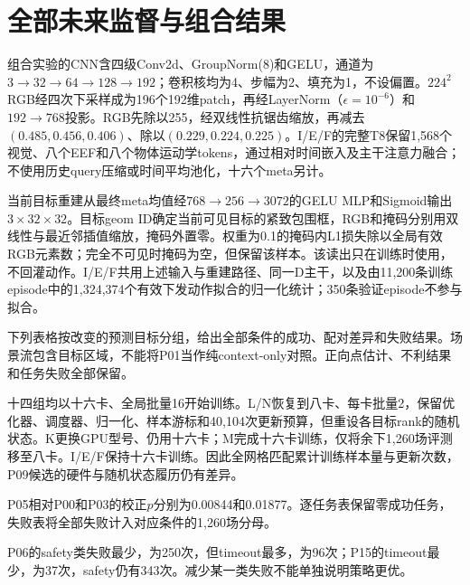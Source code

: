 \FloatBarrier
\section{全部未来监督与组合结果}
\label{app:q2}
\FloatBarrier
\begingroup
\renewenvironment{table}[1][]{\begin{readingtable}}{\end{readingtable}}
\renewenvironment{table*}[1][]{\begin{readingtable}}{\end{readingtable}}
组合实验的CNN含四级Conv2d、GroupNorm(8)和GELU，通道为$3\to32\to64\to128\to192$；卷积核均为4、步幅为2、填充为1，不设偏置。$224^2$RGB经四次下采样成为196个192维patch，再经LayerNorm（$\epsilon=10^{-6}$）和$192\to768$投影。RGB先除以255，经双线性抗锯齿缩放，再减去$(0.485,0.456,0.406)$、除以$(0.229,0.224,0.225)$。I/E/F的完整T8保留1,568个视觉、八个EEF和八个物体运动学tokens，通过相对时间嵌入及主干注意力融合；不使用历史query压缩或时间平均池化，十六个meta另计。

当前目标重建从最终meta均值经$768\to256\to3072$的GELU MLP和Sigmoid输出$3\times32\times32$。目标geom ID确定当前可见目标的紧致包围框，RGB和掩码分别用双线性与最近邻插值缩放，掩码外置零。权重为0.1的掩码内L1损失除以全局有效RGB元素数；完全不可见时掩码为空，但保留该样本。该读出只在训练时使用，不回灌动作。I/E/F共用上述输入与重建路径、同一D主干，以及由11,200条训练episode中的1,324,374个有效下发动作拟合的归一化统计；350条验证episode不参与拟合。

下列表格按改变的预测目标分组，给出全部条件的成功、配对差异和失败结果。场景流包含目标区域，不能将P01当作纯context-only对照。正向点估计、不利结果和任务失败全部保留。

十四组均以十六卡、全局批量16开始训练。L/N恢复到八卡、每卡批量2，保留优化器、调度器、归一化、样本游标和40,104次更新预算，但重设各目标rank的随机状态。K更换GPU型号、仍用十六卡；M完成十六卡训练，仅将余下1,260场评测移至八卡。I/E/F保持十六卡训练。因此全网格匹配累计训练样本量与更新次数，P09候选的硬件与随机状态履历仍有差异。

\begingroup
\renewcommand{\small}{\fontsize{9}{11}\selectfont}



P05相对P00和P03的校正$p$分别为0.00844和0.01877。逐任务表保留零成功任务，失败表将全部失败计入对应条件的1,260场分母。




P06的safety类失败最少，为250次，但timeout最多，为96次；P15的timeout最少，为37次，safety仍有343次。减少某一类失败不能单独说明策略更优。

